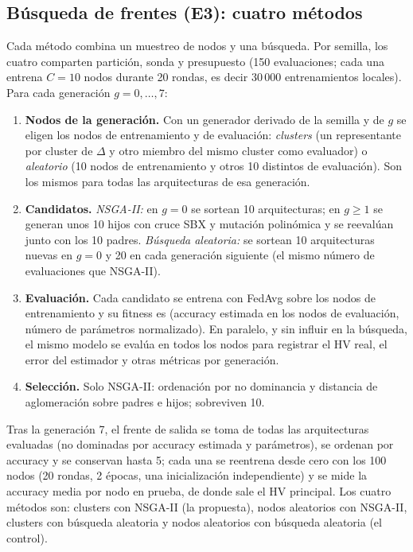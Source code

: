 \documentclass[11pt,a4paper]{article}
\begin{document}
\subsection*{Búsqueda de frentes (E3): cuatro métodos}
Cada método combina un muestreo de nodos y una búsqueda. Por semilla, los cuatro comparten partición, sonda y presupuesto (150 evaluaciones; cada una entrena $C=10$ nodos durante 20 rondas, es decir 30\,000 entrenamientos locales). Para cada generación $g=0,\dots,7$:
\begin{enumerate}[leftmargin=*,itemsep=1pt]
\item \textbf{Nodos de la generación.} Con un generador derivado de la semilla y de $g$ se eligen los nodos de entrenamiento y de evaluación: \emph{clusters} (un representante por cluster de $\Delta$ y otro miembro del mismo cluster como evaluador) o \emph{aleatorio} (10 nodos de entrenamiento y otros 10 distintos de evaluación). Son los mismos para todas las arquitecturas de esa generación.
\item \textbf{Candidatos.} \emph{NSGA-II:} en $g=0$ se sortean 10 arquitecturas; en $g\ge1$ se generan unos 10 hijos con cruce SBX y mutación polinómica y se reevalúan junto con los 10 padres. \emph{Búsqueda aleatoria:} se sortean 10 arquitecturas nuevas en $g=0$ y 20 en cada generación siguiente (el mismo número de evaluaciones que NSGA-II).
\item \textbf{Evaluación.} Cada candidato se entrena con FedAvg sobre los nodos de entrenamiento y su fitness es (accuracy estimada en los nodos de evaluación, número de parámetros normalizado). En paralelo, y sin influir en la búsqueda, el mismo modelo se evalúa en todos los nodos para registrar el HV real, el error del estimador y otras métricas por generación.
\item \textbf{Selección.} Solo NSGA-II: ordenación por no dominancia y distancia de aglomeración sobre padres e hijos; sobreviven 10.
\end{enumerate}
Tras la generación 7, el frente de salida se toma de todas las arquitecturas evaluadas (no dominadas por accuracy estimada y parámetros), se ordenan por accuracy y se conservan hasta 5; cada una se reentrena desde cero con los 100 nodos (20 rondas, 2 épocas, una inicialización independiente) y se mide la accuracy media por nodo en prueba, de donde sale el HV principal. Los cuatro métodos son: clusters con NSGA-II (la propuesta), nodos aleatorios con NSGA-II, clusters con búsqueda aleatoria y nodos aleatorios con búsqueda aleatoria (el control).
\end{document}
